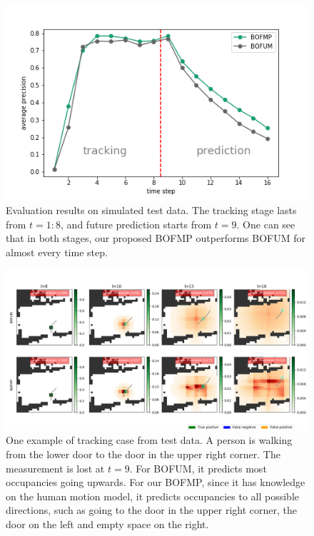 \begin{figure}[hp]
  \centering
    \includegraphics[width=.8\textwidth]{figures/test_on_simulated_data.png}
    \caption[Evaluation results on simulated test data.]{Evaluation results on simulated test data. The tracking stage lasts from $t=1:8$, and future prediction starts from $t=9$. One can see that in both stages, our proposed BOFMP outperforms BOFUM for almost every time step.}
    \label{fig:simulated_test_data}
\end{figure}

\begin{figure}[H]
  \centering
    \includegraphics[width=\textwidth]{figures/tracking_sample_for_simulated_data.png}
    \caption{One example of tracking case from test data. A person is walking from the lower door to the door in the upper right corner. The measurement is lost at $t=9$. For BOFUM, it predicts most occupancies going upwards. For our BOFMP, since it has knowledge on the human motion model, it predicts occupancies to all possible directions, such as going to the door in the upper right corner, the door on the left and empty space on the right.}
    \label{fig:tracking_simulated_data}
\end{figure}

